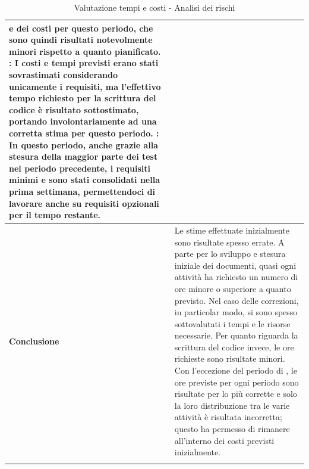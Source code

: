 \documentclass[12pt,a4paper]{article}
\begin{document}
\begin{center}
\begin{longtable}[H]{p{} p{}}
                e dei costi per questo periodo, che sono quindi risultati notevolmente minori rispetto a quanto
                pianificato. \newline
            \textbf{\FC{}}: I costi e tempi previsti erano stati sovrastimati considerando unicamente i requisiti, ma l'effettivo tempo richiesto per la scrittura del codice è risultato sottostimato, portando involontariamente ad una corretta stima per questo periodo. \newline
            \textbf{\FVV{}}: In questo periodo, anche grazie alla stesura della maggior parte dei test nel periodo precedente, i requisiti minimi e sono stati consolidati nella prima settimana, permettendoci di lavorare anche su requisiti opzionali per il tempo restante. \\*
        \midrule
        \textbf{Conclusione} & Le stime effettuate inizialmente sono risultate spesso errate. A parte per lo sviluppo e stesura iniziale dei documenti, quasi ogni attività ha richiesto un numero di ore minore o superiore a quanto previsto. Nel caso delle correzioni, in particolar modo, si sono spesso sottovalutati i tempi e le risorse necessarie. Per quanto riguarda la scrittura del codice invece, le ore richieste sono risultate minori. Con l'eccezione del periodo di \FAD{}, le ore previste per ogni periodo sono risultate per lo più corrette e solo la loro distribuzione tra le varie attività è risultata incorretta; questo ha permesso di rimanere all'interno dei costi previsti inizialmente. \\*
		\bottomrule
		\caption{Valutazione tempi e costi - Analisi dei rischi}
	\end{longtable}
\end{center}
\end{document}
